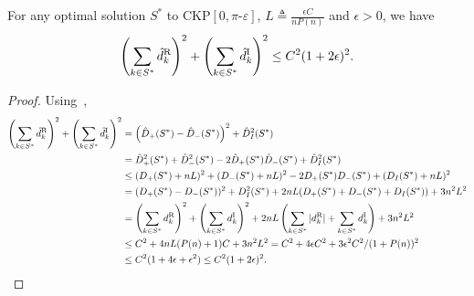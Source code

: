 \begin{lemma}
For any optimal solution $S^*$ to \textsc{CKP$[0,\pi\mbox{-}\varepsilon]$}, $L\triangleq \frac{\epsilon C}{nP(n)}$ and $\epsilon> 0$, we have
\begin{equation}
 \left( \sum_{k \in S^*} \hat d_k^{\rm R} \right)^2 +  \left(\sum_{k \in S^*} \hat   d_k^{\rm I} \right)^2  \le C^2 ( 1 + 2\epsilon)^2 .
 \label{eq:lem}
\end{equation}
 \label{lem-trunc}
\end{lemma}
\begin{proof}


Using~,
\begin{align}
\left( \sum_{k \in S^*} \hat d_k^{\rm R} \right)^2 +  \left(\sum_{k \in S^*} \hat d_k^{\rm I} \right)^2 &=\left(\hat D_+(S^*)- \hat D_-(S^*)\right)^2 +  \hat D_I^2(S^*)\nonumber\\
&=\hat D_+^2(S^*)+\hat D_-^2(S^*)-2\hat D_+(S^*)\hat D_-(S^*)+\hat D_I^2(S^*)\nonumber\\ 
&\le (D_+(S^*)+nL)^2+(D_-(S^*)+nL)^2-2D_+(S^*) D_-(S^*)+(D_I(S^*)+nL)^2\nonumber\\
&=(D_+(S^*)-D_-(S^*))^2+D_I^2(S^*)+2nL (D_+(S^*)+D_-(S^*)+D_I(S^*))+3n^2L^2\nonumber\\
&= \left(\sum_{k\in S^*} d_k^{\rm R} \right)^2 + \left(\sum_{k\in S^*} d_k^{\rm I}  \right)^2 +2nL\left(\sum_{k\in S^*}|d_k^{\rm R}|+\sum_{k\in S^*}d_k^{\rm I}\right)+3n^2L^2\nonumber\\
&\le C^2 + 4nL (P(n)+1) C + 3n^2L^2 = C^2 + 4 \epsilon C^2 + 3\epsilon^2 C^2/(1+P(n))^2\nonumber \\ &\le C^2 (1+4\epsilon + \epsilon^2)\le C^2(1+2\epsilon)^2\label{lem1-p2}.
\end{align}
\end{proof}

